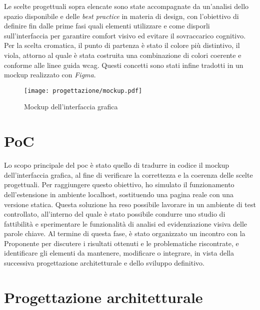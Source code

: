 \vspace{10pt}
\par\noindent Le scelte progettuali sopra elencate sono state accompagnate da un’analisi dello spazio disponibile e delle \textit{best practice} in materia di design, con l’obiettivo di definire fin dalle prime fasi quali elementi utilizzare e come disporli sull’interfaccia per garantire comfort visivo ed evitare il sovraccarico cognitivo. Per la scelta cromatica, il punto di partenza è stato il colore più distintivo, il viola, attorno al quale è stata costruita una combinazione di colori coerente e conforme alle linee guida \gls{wcag}. Questi concetti sono stati infine tradotti in un mockup realizzato con \textit{Figma}.

\begin{figure}[H]
    \centering 
    \texttt{[image: progettazione/mockup.pdf]} 
    \caption{Mockup dell'interfaccia grafica}
\end{figure}

\section{PoC}
\label{sec:poc}

\par Lo scopo principale del \gls{poc} è stato quello di tradurre in codice il mockup dell’interfaccia grafica, al fine di verificare la correttezza e la coerenza delle scelte progettuali. Per raggiungere questo obiettivo, ho simulato il funzionamento dell’estensione in ambiente \gls{localhost}, sostituendo una pagina reale con una versione statica. Questa soluzione ha reso possibile lavorare in un ambiente di test controllato, all’interno del quale è stato possibile condurre uno studio di fattibilità e sperimentare le funzionalità di analisi ed evidenziazione visiva delle parole chiave. Al termine di questa fase, è stato organizzato un incontro con la Proponente per discutere i risultati ottenuti e le problematiche riscontrate, e identificare gli elementi da mantenere, modificare o integrare, in vista della successiva progettazione architetturale e dello sviluppo definitivo.

\section{Progettazione architetturale}
\label{sec:progettazione}


